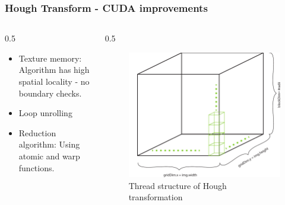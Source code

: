 \documentclass{beamer}
\begin{document}
\begin{frame}
	[fragile] \frametitle{Hough Transform - CUDA improvements} 
	\begin{columns}
		\begin{column}
			{0.5
			\textwidth} 
			\begin{itemize}
				\item Texture memory: Algorithm has high spatial locality - no boundary checks. 
				\item Loop unrolling 
				\item Reduction algorithm: Using atomic and warp functions. 
			\end{itemize}
		\end{column}
		\begin{column}
			{0.5
			\textwidth} 
			\begin{figure}
				[ht] \centering 
				\includegraphics[width=0.999
				\textwidth]{../report/iris/hough_impl} \caption{Thread structure of Hough transformation} \label{fig:hough_impl} 
			\end{figure}
		\end{column}
	\end{columns}
\end{frame}
\end{document}
